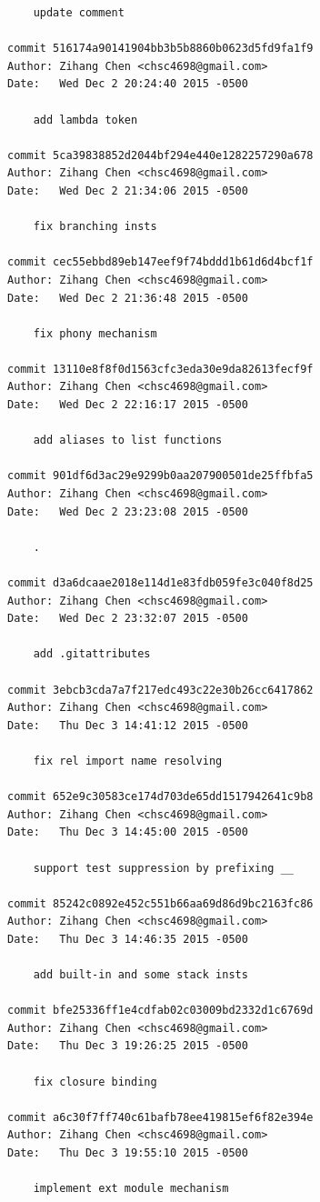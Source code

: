 \documentclass{report}
\begin{document}
\begin{appendices}
\begin{verbatim}
    update comment

commit 516174a90141904bb3b5b8860b0623d5fd9fa1f9
Author: Zihang Chen <chsc4698@gmail.com>
Date:   Wed Dec 2 20:24:40 2015 -0500

    add lambda token

commit 5ca39838852d2044bf294e440e1282257290a678
Author: Zihang Chen <chsc4698@gmail.com>
Date:   Wed Dec 2 21:34:06 2015 -0500

    fix branching insts

commit cec55ebbd89eb147eef9f74bddd1b61d6d4bcf1f
Author: Zihang Chen <chsc4698@gmail.com>
Date:   Wed Dec 2 21:36:48 2015 -0500

    fix phony mechanism

commit 13110e8f8f0d1563cfc3eda30e9da82613fecf9f
Author: Zihang Chen <chsc4698@gmail.com>
Date:   Wed Dec 2 22:16:17 2015 -0500

    add aliases to list functions

commit 901df6d3ac29e9299b0aa207900501de25ffbfa5
Author: Zihang Chen <chsc4698@gmail.com>
Date:   Wed Dec 2 23:23:08 2015 -0500

    .

commit d3a6dcaae2018e114d1e83fdb059fe3c040f8d25
Author: Zihang Chen <chsc4698@gmail.com>
Date:   Wed Dec 2 23:32:07 2015 -0500

    add .gitattributes

commit 3ebcb3cda7a7f217edc493c22e30b26cc6417862
Author: Zihang Chen <chsc4698@gmail.com>
Date:   Thu Dec 3 14:41:12 2015 -0500

    fix rel import name resolving

commit 652e9c30583ce174d703de65dd1517942641c9b8
Author: Zihang Chen <chsc4698@gmail.com>
Date:   Thu Dec 3 14:45:00 2015 -0500

    support test suppression by prefixing __

commit 85242c0892e452c551b66aa69d86d9bc2163fc86
Author: Zihang Chen <chsc4698@gmail.com>
Date:   Thu Dec 3 14:46:35 2015 -0500

    add built-in and some stack insts

commit bfe25336ff1e4cdfab02c03009bd2332d1c6769d
Author: Zihang Chen <chsc4698@gmail.com>
Date:   Thu Dec 3 19:26:25 2015 -0500

    fix closure binding

commit a6c30f7ff740c61bafb78ee419815ef6f82e394e
Author: Zihang Chen <chsc4698@gmail.com>
Date:   Thu Dec 3 19:55:10 2015 -0500

    implement ext module mechanism


\end{verbatim}
\end{appendices}
\end{document}
